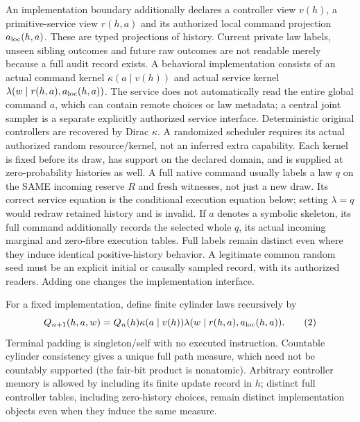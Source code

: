 \documentclass{article}
\begin{document}
An implementation boundary additionally declares a controller view $v(h)$, a primitive-service view $r(h,a)$ and its authorized local command projection $a_{\rm loc}(h,a)$. These are typed projections of history. Current private law labels, unseen sibling outcomes and future raw outcomes are not readable merely because a full audit record exists. A behavioral implementation consists of an actual command kernel $\kappa(a\mid v(h))$ and actual service kernel $\lambda(w\mid r(h,a),a_{\rm loc}(h,a))$. The service does not automatically read the entire global command $a$, which can contain remote choices or law metadata; a central joint sampler is a separate explicitly authorized service interface. Deterministic original controllers are recovered by Dirac $\kappa$. A randomized scheduler requires its actual authorized random resource/kernel, not an inferred extra capability. Each kernel is fixed before its draw, has support on the declared domain, and is supplied at zero-probability histories as well. A full native command usually labels a law $q$ on the SAME incoming reserve $R$ and fresh witnesses, not just a new draw. Its correct service equation is the conditional execution equation below; setting $\lambda=q$ would redraw retained history and is invalid. If $a$ denotes a symbolic skeleton, its full command additionally records the selected whole $q$, its actual incoming marginal and zero-fibre execution tables. Full labels remain distinct even where they induce identical positive-history behavior. A legitimate common random seed must be an explicit initial or causally sampled record, with its authorized readers. Adding one changes the implementation interface.

For a fixed implementation, define finite cylinder laws recursively by
\[
 Q_{n+1}(h,a,w)=Q_n(h)\kappa(a\mid v(h))
                  \lambda(w\mid r(h,a),a_{\rm loc}(h,a)).\tag{2}
\]
Terminal padding is singleton/self with no executed instruction. Countable cylinder consistency gives a unique full path measure, which need not be countably supported (the fair-bit product is nonatomic). Arbitrary controller memory is allowed by including its finite update record in $h$; distinct full controller tables, including zero-history choices, remain distinct implementation objects even when they induce the same measure.
\end{document}
